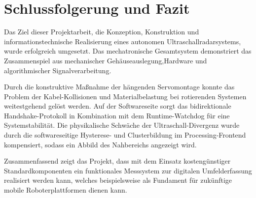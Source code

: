 %
%
%


\chapter{Schlussfolgerung und Fazit}
\label{chap:Conclusion_Radar}

Das Ziel dieser Projektarbeit, die Konzeption, Konstruktion und informationstechnische Realisierung eines autonomen Ultraschallradarsystems, wurde erfolgreich umgesetzt. Das mechatronische Gesamtsystem demonstriert das Zusammenspiel aus mechanischer Gehäuseauslegung,Hardware und algorithmischer Signalverarbeitung.

Durch die konstruktive Maßnahme der hängenden Servomontage konnte das Problem der Kabel-Kollisionen und Materialbelastung bei rotierenden Systemen weitestgehend gelöst werden. Auf der Softwareseite sorgt das bidirektionale Handshake-Protokoll in Kombination mit dem Runtime-Watchdog für eine Systemstabilität. Die physikalische Schwäche der Ultraschall-Divergenz wurde durch die softwareseitige Hysterese- und Clusterbildung im Processing-Frontend kompensiert, sodass ein Abbild des Nahbereichs angezeigt wird.

Zusammenfassend zeigt das Projekt, dass mit dem Einsatz kostengünstiger Standardkomponenten ein funktionales Messsystem zur digitalen Umfelderfassung realisiert werden kann, welches beispielsweise als Fundament für zukünftige mobile Roboterplattformen dienen kann.